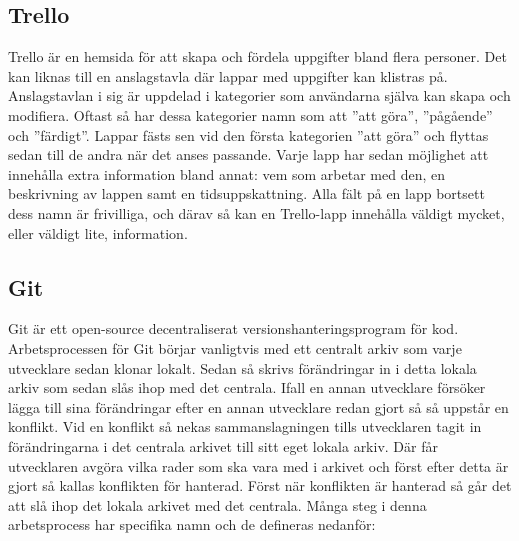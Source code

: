 \subsection*{Trello}
Trello är en hemsida för att skapa och fördela uppgifter bland flera personer. Det kan liknas till en anslagstavla där lappar med uppgifter kan klistras på. Anslagstavlan i sig är uppdelad i kategorier som användarna själva kan skapa och modifiera. Oftast så har dessa kategorier namn som att ''att göra'', ''pågående'' och ''färdigt''. Lappar fästs sen vid den första kategorien ''att göra'' och flyttas sedan till de andra när det anses passande. Varje lapp har sedan möjlighet att innehålla extra information bland annat: vem som arbetar med den, en beskrivning av lappen samt en tidsuppskattning. Alla fält på en lapp bortsett dess namn är frivilliga, och därav så kan en Trello-lapp innehålla väldigt mycket, eller väldigt lite, information.

\subsection*{Git}
Git \cite{Git} är ett open-source decentraliserat versionshanteringsprogram för kod. Arbetsprocessen för Git börjar vanligtvis med ett centralt arkiv som varje utvecklare sedan klonar lokalt. Sedan så skrivs förändringar in i detta lokala arkiv som sedan slås ihop med det centrala. Ifall en annan utvecklare försöker lägga till sina förändringar efter en annan utvecklare redan gjort så så uppstår en konflikt. Vid en konflikt så nekas sammanslagningen tills utvecklaren tagit in förändringarna i det centrala arkivet till sitt eget lokala arkiv. Där får utvecklaren avgöra vilka rader som ska vara med i arkivet och först efter detta är gjort så kallas konflikten för hanterad. Först när konflikten är hanterad så går det att slå ihop det lokala arkivet med det centrala. Många steg i denna arbetsprocess har specifika namn och de defineras nedanför:

